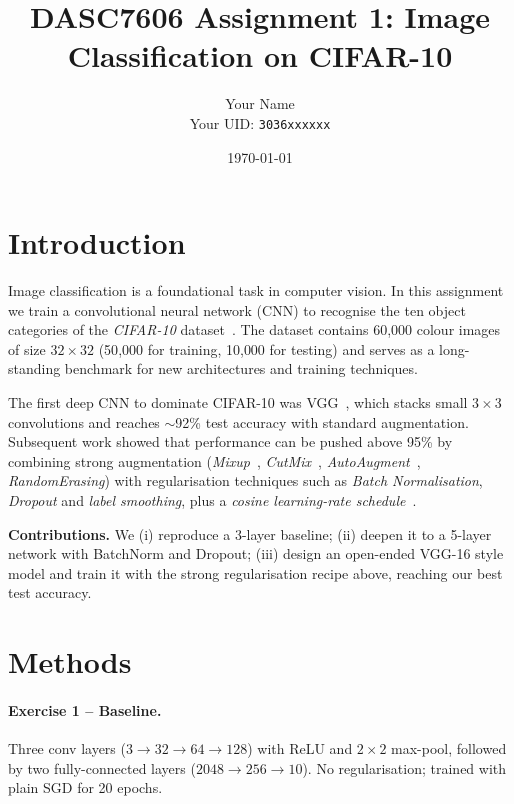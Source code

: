 \documentclass[10pt,conference]{article}
\title{DASC7606 Assignment 1: Image Classification on CIFAR-10}
\author{Your Name \\ Your UID: \texttt{3036xxxxxx}}
\date{\today}
\begin{document}
\maketitle

\section{Introduction}
Image classification is a foundational task in computer vision.
In this assignment we train a convolutional neural network (CNN)
to recognise the ten object categories of the
\textit{CIFAR-10} dataset~\cite{krizhevsky2009cifar}.
The dataset contains 60{,}000 colour images of size $32 \times 32$
(50{,}000 for training, 10{,}000 for testing) and serves as a long-standing
benchmark for new architectures and training techniques.

The first deep CNN to dominate CIFAR-10 was VGG~\cite{simonyan2015vgg},
which stacks small $3\times3$ convolutions and reaches $\sim$92\% test
accuracy with standard augmentation. Subsequent work showed that
performance can be pushed above 95\% by combining strong augmentation
(\textit{Mixup}~\cite{zhang2018mixup}, \textit{CutMix}~\cite{yun2019cutmix},
\textit{AutoAugment}~\cite{cubuk2019autoaugment}, \textit{RandomErasing})
with regularisation techniques such as \textit{Batch Normalisation},
\textit{Dropout} and \textit{label smoothing}, plus a
\textit{cosine learning-rate schedule}~\cite{loshchilov2017sgdr}.

\textbf{Contributions.}  We (i) reproduce a 3-layer baseline;
(ii) deepen it to a 5-layer network with BatchNorm and Dropout;
(iii) design an open-ended VGG-16 style model and train it with the
strong regularisation recipe above, reaching our best test accuracy.

\section{Methods}
\paragraph{Exercise 1 -- Baseline.}  Three conv layers
($3 \to 32 \to 64 \to 128$) with ReLU and $2\times2$ max-pool,
followed by two fully-connected layers
($2048 \to 256 \to 10$).  No regularisation; trained with plain SGD
for 20 epochs.
\end{document}
